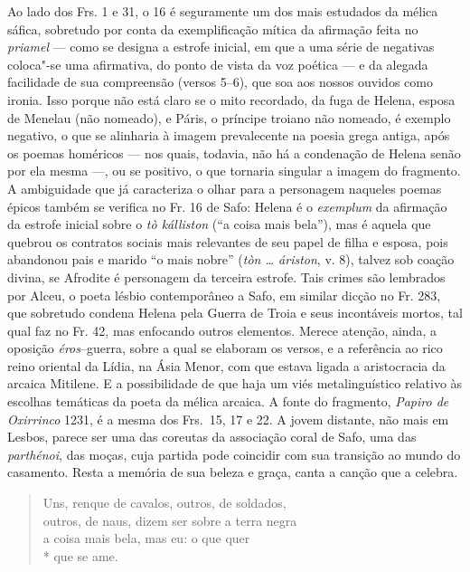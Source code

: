 {{\small Ao lado dos Frs. 1 e 31, o 16 é seguramente um dos mais estudados da mélica
sáfica, sobretudo por conta da exemplificação mítica da afirmação feita no
\textit{priamel} --- como se designa a estrofe inicial, em que a uma série de
negativas coloca"-se uma afirmativa, do ponto de vista da voz poética --- e da
alegada facilidade de sua compreensão (versos 5--6), que soa aos nossos ouvidos
como ironia. Isso porque não está claro se o mito recordado, da fuga de Helena, esposa 
de Menelau (não nomeado), e Páris, o príncipe troiano não nomeado, é exemplo
negativo, o que se alinharia à imagem prevalecente na poesia grega antiga, após
os poemas homéricos --- nos quais, todavia, não há a condenação de Helena senão por ela mesma ---, ou se positivo, o que tornaria singular a imagem do fragmento. A
ambiguidade que já caracteriza o olhar para a personagem naqueles poemas épicos também se verifica no Fr. 16 de Safo: Helena é o \textit{exemplum} da afirmação da estrofe inicial sobre o \textit{tò kálliston} (``a coisa mais bela''), mas é aquela que quebrou os contratos sociais mais relevantes de seu papel de filha e esposa, pois abandonou pais e marido ``o mais nobre'' (\textit{tòn \ldots{} áriston}, v. 8), talvez sob coação divina, se Afrodite é personagem da terceira estrofe. Tais crimes são lembrados por Alceu, o poeta lésbio contemporâneo a Safo, em similar dicção no Fr. 283, que sobretudo condena Helena pela Guerra de Troia e seus incontáveis mortos, tal qual faz no Fr. 42, mas enfocando outros elementos. Merece atenção, ainda, a
oposição \textit{éros}--guerra, sobre a qual se elaboram os versos, e a
referência ao rico reino oriental da Lídia, na Ásia Menor, com que estava
ligada a aristocracia da arcaica Mitilene. E a possibilidade de que haja um
viés metalinguístico relativo às escolhas temáticas da poeta da mélica arcaica.
A fonte do fragmento, \textit{Papiro de Oxirrinco} 1231, é a mesma dos Frs.~15, 17 e 22.
A jovem distante, não mais em Lesbos, parece ser uma das coreutas da associação coral de Safo, uma das \textit{parthénoi}, das moças, cuja partida pode coincidir com sua transição ao mundo do casamento. Resta a memória de sua beleza e graça, canta a canção que a celebra.}

\begin{verse}
Uns, renque de cavalos, outros, de soldados,\\
outros, de naus, dizem ser sobre a terra negra\\
a coisa mais bela, mas eu: o que quer\\*
que se ame.


\end{verse}}
